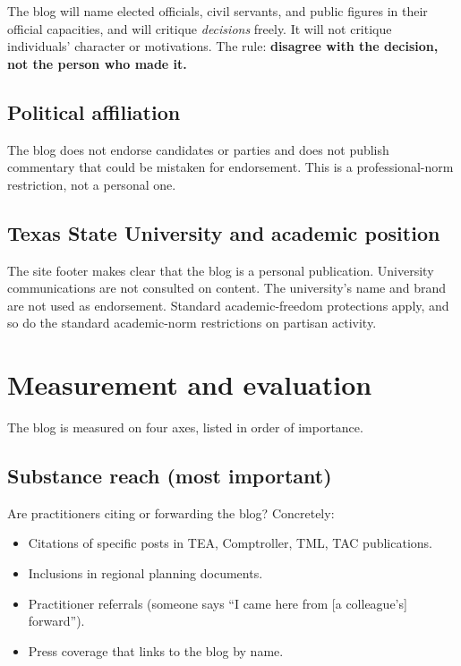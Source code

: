 \documentclass[11pt]{article}
\begin{document}
The blog will name elected officials, civil servants, and public
figures in their official capacities, and will critique
\emph{decisions} freely. It will not critique individuals'
character or motivations. The rule: \textbf{disagree with the
decision, not the person who made it.}

\subsection{Political affiliation}

The blog does not endorse candidates or parties and does not
publish commentary that could be mistaken for endorsement. This
is a professional-norm restriction, not a personal one.

\subsection{Texas State University and academic position}

The site footer makes clear that the blog is a personal
publication. University communications are not consulted on
content. The university's name and brand are not used as
endorsement. Standard academic-freedom protections apply, and so
do the standard academic-norm restrictions on partisan activity.

\section{Measurement and evaluation}

The blog is measured on four axes, listed in order of importance.

\subsection{Substance reach (most important)}

Are practitioners citing or forwarding the blog? Concretely:
\begin{itemize}
\item Citations of specific posts in TEA, Comptroller, TML, TAC
publications.
\item Inclusions in regional planning documents.
\item Practitioner referrals (someone says ``I came here from
[a colleague's] forward'').
\item Press coverage that links to the blog by name.
\end{itemize}
\end{document}
